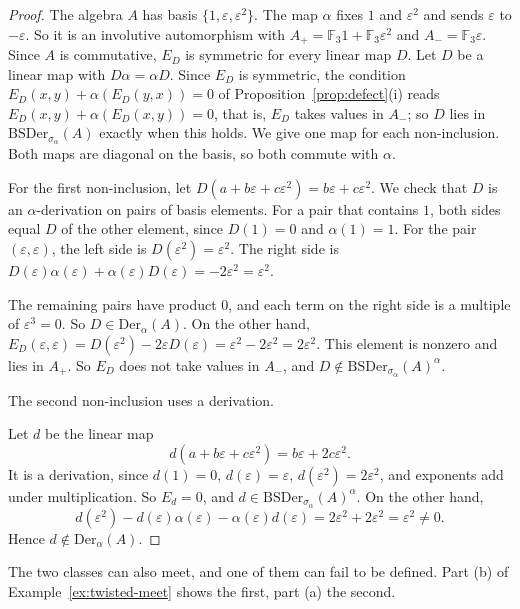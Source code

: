 \documentclass[]{interact}
\theoremstyle{plain}
\theoremstyle{definition}
\theoremstyle{remark}
\newcommand{\BSDer}{\mathrm{BSDer}}
\newcommand{\ADer}{\mathrm{Der}_\alpha}
\begin{document}
\begin{proof}
The algebra $A$ has basis $\{1, \varepsilon, \varepsilon^2\}$.
The map $\alpha$ fixes $1$ and $\varepsilon^2$ and sends $\varepsilon$ to $-\varepsilon$.
So it is an involutive automorphism with $A_+ = \mathbb{F}_3 1 + \mathbb{F}_3\varepsilon^2$ and $A_- = \mathbb{F}_3\varepsilon$.
Since $A$ is commutative, $E_D$ is symmetric for every linear map $D$.
Let $D$ be a linear map with $D\alpha = \alpha D$.
Since $E_D$ is symmetric, the condition $E_D(x,y) + \alpha(E_D(y,x)) = 0$ of Proposition~\ref{prop:defect}(i) reads $E_D(x,y) + \alpha(E_D(x,y)) = 0$, that is, $E_D$ takes values in $A_-$; so $D$ lies in $\BSDer_{\sigma_\alpha}(A)$ exactly when this holds.
We give one map for each non-inclusion.
Both maps are diagonal on the basis, so both commute with $\alpha$.

For the first non-inclusion, let $D(a + b\varepsilon + c\varepsilon^2) = b\varepsilon + c\varepsilon^2$.
We check that $D$ is an $\alpha$-derivation on pairs of basis elements.
For a pair that contains $1$, both sides equal $D$ of the other element, since $D(1) = 0$ and $\alpha(1) = 1$.
For the pair $(\varepsilon, \varepsilon)$, the left side is $D(\varepsilon^2) = \varepsilon^2$.
The right side is $D(\varepsilon)\alpha(\varepsilon) + \alpha(\varepsilon)D(\varepsilon) = -2\varepsilon^2 = \varepsilon^2$.

The remaining pairs have product $0$, and each term on the right side is a multiple of $\varepsilon^3 = 0$.
So $D \in \ADer(A)$.
On the other hand, $E_D(\varepsilon, \varepsilon) = D(\varepsilon^2) - 2\varepsilon D(\varepsilon) = \varepsilon^2 - 2\varepsilon^2 = 2\varepsilon^2$.
This element is nonzero and lies in $A_+$.
So $E_D$ does not take values in $A_-$, and $D \notin \BSDer_{\sigma_\alpha}(A)^\alpha$.

The second non-inclusion uses a derivation.

Let $d$ be the linear map
\[
d(a + b\varepsilon + c\varepsilon^2) = b\varepsilon + 2c\varepsilon^2.
\]
It is a derivation, since $d(1) = 0$, $d(\varepsilon) = \varepsilon$, $d(\varepsilon^2) = 2\varepsilon^2$, and exponents add under multiplication.
So $E_d = 0$, and $d \in \BSDer_{\sigma_\alpha}(A)^\alpha$.
On the other hand,
\[
d(\varepsilon^2) - d(\varepsilon)\alpha(\varepsilon) - \alpha(\varepsilon)d(\varepsilon) = 2\varepsilon^2 + 2\varepsilon^2 = \varepsilon^2 \neq 0.
\]
Hence $d \notin \ADer(A)$.
\end{proof}

The two classes can also meet, and one of them can fail to be defined. Part (b) of Example~\ref{ex:twisted-meet} shows the first, part (a) the second. %
\end{document}
